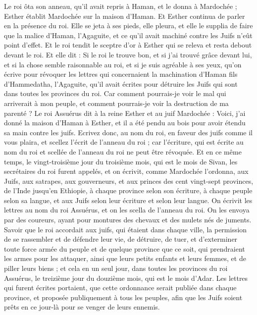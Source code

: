 \begin{multicols}{2}
Le roi ôta son anneau, qu'il avait repris à Haman, et le donna à Mardochée ; Esther établit Mardochée sur la maison d'Haman.
Et Esther continua de parler en la présence du roi. Elle se jeta à ses pieds, elle pleura, et elle le supplia de faire que la malice d’Haman, l’Agaguite, et ce qu’il avait machiné contre les Juifs n’eût point d’effet.
Et le roi tendit le sceptre d'or à Esther qui se releva et resta debout devant le roi.
Et elle dit : Si le roi le trouve bon, et si j’ai trouvé grâce devant lui, et si la chose semble raisonnable au roi, et si je suis agréable à ses yeux, qu’on écrive pour révoquer les lettres qui concernaient la machination d’Haman fils d’Hammedatha, l’Agaguite, qu’il avait écrites pour détruire les Juifs qui sont dans toutes les provinces du roi.
Car comment pourrais-je voir le mal qui arriverait à mon peuple, et comment pourrais-je voir la destruction de ma parenté ?
Le roi Assuérus dit à la reine Esther et au juif Mardochée : Voici, j'ai donné la maison d'Haman à Esther, et il a été pendu au bois pour avoir étendu sa main contre les juifs.
Ecrivez donc, au nom du roi, en faveur des juifs comme il vous plaira, et scellez l'écrit de l'anneau du roi ; car l’écriture, qui est écrite au nom du roi et scellée de l'anneau du roi ne peut être révoquée.
Et en ce même temps, le vingt-troisième jour du troisième mois, qui est le mois de Sivan, les secrétaires du roi furent appelés, et on écrivit, comme Mardochée l’ordonna, aux Juifs, aux satrapes, aux gouverneurs, et aux princes des cent vingt-sept provinces, de l’Inde jusqu'en Ethiopie, à chaque province selon son écriture, à chaque peuple selon sa langue, et aux Juifs selon leur écriture et selon leur langue.
On écrivit les lettres au nom du roi Assuérus, et on les scella de l'anneau du roi. On les envoya par des coureurs, ayant pour montures des chevaux et des mulets nés de juments.
Savoir que le roi accordait aux juifs, qui étaient dans chaque ville, la permission de se rassembler et de défendre leur vie, de détruire, de tuer, et d’exterminer toute force armée du peuple et de quelque province que ce soit, qui prendraient les armes pour les attaquer, ainsi que leurs petits enfants et leurs femmes, et de piller leurs biens ;
et cela en un seul jour, dans toutes les provinces du roi Assuérus, le treizième jour du douzième mois, qui est le mois d'Adar.
Les lettres qui furent écrites portaient, que cette ordonnance serait publiée dans chaque province, et proposée publiquement à tous les peuples, afin que les Juifs soient prêts en ce jour-là pour se venger de leurs ennemis.

\end{multicols}
